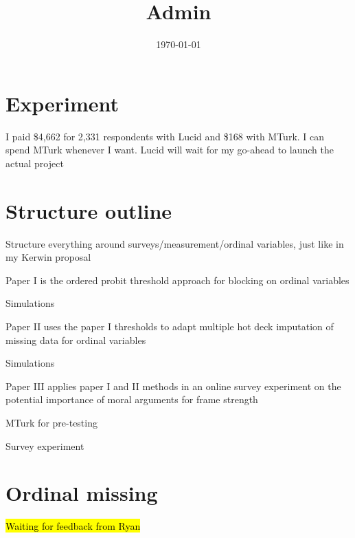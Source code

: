 

\title{Admin}

\date{\today}



\maketitle


\section*{Experiment}
	\begin{coi}
		\item I paid \$4,662 for 2,331 respondents with Lucid and \$168 with MTurk. I can spend MTurk whenever I want. Lucid will wait for my go-ahead to launch the actual project
	\end{coi}	
	
\section*{Structure outline}
	\begin{coi}
		\item Structure everything around surveys/measurement/ordinal variables, just like in my Kerwin proposal
		\item Paper I is the ordered probit threshold approach for blocking on ordinal variables
			\begin{coi}
				\item Simulations
			\end{coi}
		\item Paper II uses the paper I thresholds to adapt multiple hot deck imputation of missing data for ordinal variables
			\begin{coi}
				\item Simulations
			\end{coi}
		\item Paper III applies paper I and II methods in an online survey experiment on the potential importance of moral arguments for frame strength
			\begin{coi}
				\item MTurk for pre-testing
				\item Survey experiment
			\end{coi}
	\end{coi}


\section*{Ordinal missing}
	\begin{coi}
		\item \hl{Waiting for feedback from Ryan}
	\end{coi}
	
